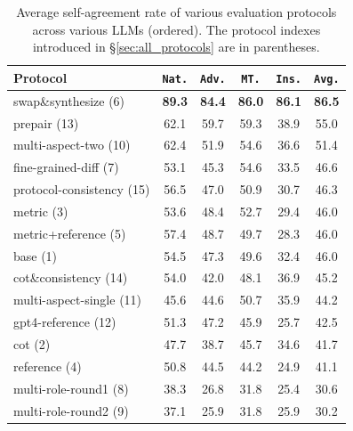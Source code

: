 \documentclass[11pt]{article}
\newcommand{\natshort}{\texttt{Nat.}\xspace}
\newcommand{\advshort}{\texttt{Adv.}\xspace}
\newcommand{\mtshort}{\texttt{MT.}\xspace}
\newcommand{\insshort}{\texttt{Ins.}\xspace}
\begin{document}
\renewcommand{\arraystretch}{1.12} 
\begin{table}[t!]
\small
\centering
\addtolength{\tabcolsep}{-2.5pt} 
\begin{tabular}{@{}lccccc@{}}
\toprule
\textbf{Protocol} & \textbf{\natshort} & \textbf{\advshort} & \textbf{\mtshort}  & \textbf{\insshort} & \textbf{\texttt{Avg.}}\\
\midrule
 swap\&synthesize (6)      & \textbf{89.3}    & \textbf{84.4}        & \textbf{86.0} & \textbf{86.1}   & \textbf{86.5} \\
 prepair (13)              & 62.1             & 59.7                 & 59.3          & 38.9            & 55.0          \\
 multi-aspect-two (10)     & 62.4             & 51.9                 & 54.6          & 36.6            & 51.4          \\
 fine-grained-diff (7)     & 53.1             & 45.3                 & 54.6          & 33.5            & 46.6          \\
 protocol-consistency (15) & 56.5             & 47.0                 & 50.9          & 30.7            & 46.3          \\
 metric (3)                & 53.6             & 48.4                 & 52.7          & 29.4            & 46.0          \\
 metric+reference (5)      & 57.4             & 48.7                 & 49.7          & 28.3            & 46.0          \\
 base (1)                  & 54.5             & 47.3                 & 49.6          & 32.4            & 46.0          \\
 cot\&consistency (14)     & 54.0             & 42.0                 & 48.1          & 36.9            & 45.2          \\
 multi-aspect-single (11)  & 45.6             & 44.6                 & 50.7          & 35.9            & 44.2          \\
 gpt4-reference (12)       & 51.3             & 47.2                 & 45.9          & 25.7            & 42.5          \\
 cot (2)                   & 47.7             & 38.7                 & 45.7          & 34.6            & 41.7          \\
 reference (4)             & 50.8             & 44.5                 & 44.2          & 24.9            & 41.1          \\
 multi-role-round1 (8)     & 38.3             & 26.8                 & 31.8          & 25.4            & 30.6          \\
 multi-role-round2 (9)     & 37.1             & 25.9                 & 31.8          & 25.9            & 30.2          \\
\bottomrule
\end{tabular}
\addtolength{\tabcolsep}{+2.5pt} 
\caption{Average self-agreement rate of various evaluation protocols across various LLMs (ordered).
The protocol indexes introduced in \S\ref{sec:all_protocols} are in parentheses.
% 
}
\label{tab:protocol-avg-agreement} 
\end{table}
\end{document}

